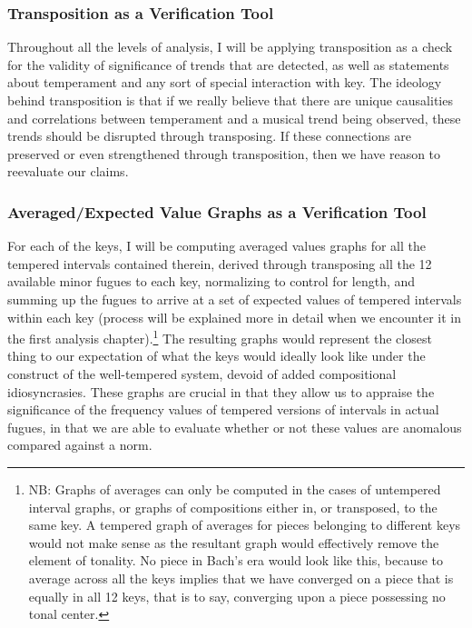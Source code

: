 \subsubsection{Transposition as a Verification
Tool}\label{transposition-as-a-verification-tool}

Throughout all the levels of analysis, I will be applying transposition
as a check for the validity of significance of trends that are detected,
as well as statements about temperament and any sort of special
interaction with key. The ideology behind transposition is that if we
really believe that there are unique causalities and correlations
between temperament and a musical trend being observed, these trends
should be disrupted through transposing. If these connections are
preserved or even strengthened through transposition, then we have
reason to reevaluate our claims.

\subsubsection{Averaged/Expected Value Graphs as a Verification
Tool}\label{averagedexpected-value-graphs-as-a-verification-tool}

For each of the keys, I will be computing averaged values graphs for all
the tempered intervals contained therein, derived through transposing
all the 12 available minor fugues to each key, normalizing to control
for length, and summing up the fugues to arrive at a set of expected
values of tempered intervals within each key (process will be explained
more in detail when we encounter it in the first analysis
chapter).\footnote{NB: Graphs of averages can only be computed in the cases of untempered interval graphs, or graphs of compositions either in, or transposed, to the same key. A tempered graph of averages for pieces belonging to different keys would not make sense as the resultant graph would effectively remove the element of tonality. No piece in Bach's era would look like this, because to average across all the keys implies that we have converged on a piece that is equally in all 12 keys, that is to say, converging upon a piece possessing no tonal center.}
The resulting graphs would represent the closest thing to our
expectation of what the keys would ideally look like under the construct
of the well-tempered system, devoid of added compositional
idiosyncrasies. These graphs are crucial in that they allow us to
appraise the significance of the frequency values of tempered versions
of intervals in actual fugues, in that we are able to evaluate whether
or not these values are anomalous compared against a norm.

